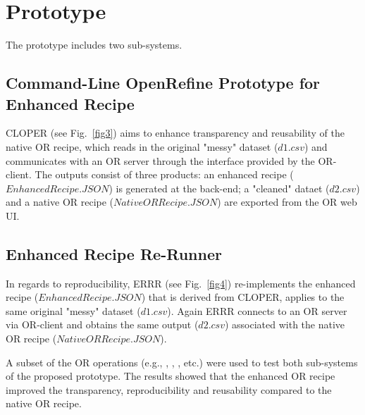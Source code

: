 \documentclass[runningheads]{llncs}
\begin{document}
\section{Prototype}
The prototype includes two sub-systems. 
\subsection{Command-Line OpenRefine Prototype for Enhanced Recipe} CLOPER (see Fig.~\ref{fig3}) aims to enhance transparency and reusability of the native OR recipe, which reads in the original "messy" dataset ($d1.csv$) and communicates with an OR server through the interface provided by the OR-client. The outputs consist of three products: an enhanced recipe ($EnhancedRecipe.JSON$) is generated at the back-end; a "cleaned" dataet ($d2.csv$) and a native OR recipe ($NativeORRecipe.JSON$) are exported from the OR web UI. 
\subsection{Enhanced Recipe Re-Runner}
In regards to reproducibility, ERRR (see Fig.~\ref{fig4}) re-implements the enhanced recipe ($EnhancedRecipe.JSON$) that is derived from CLOPER, applies to the same original "messy" dataset ($d1.csv$). Again ERRR connects to an OR server via OR-client and obtains the same output ($d2.csv$) associated with the native OR recipe ($NativeORRecipe.JSON$).

A subset of the OR operations (e.g., , ,  , etc.) were used to test both sub-systems of the proposed prototype. The results showed that the enhanced OR recipe improved the transparency, reproducibility and reusability compared to the native OR recipe. 
\end{document}
